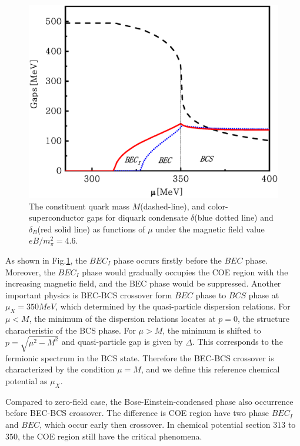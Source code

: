 \documentclass[prd, showpacs,nofootinbib,amsmath,amssymb,12pt]{revtex4}
\begin{document}
\begin{figure}[ht]
	\centering
	\includegraphics[scale=0.3]{1.eps}
	\caption{The constituent quark mass $M$(dashed-line), and color-superconductor gaps for diquark condensate $\delta$(blue dotted line) and $\delta_B$(red solid line) as functions of $\mu$ under the magnetic field value $eB/m^2_\pi=4.6$.}
	\label{f2}
\end{figure}

As shown in Fig.\ref{f2}, the $BEC_I$ phase occurs firstly before the $BEC$ phase.
Moreover, the $BEC_I$ phase would gradually occupies the COE region with the increasing magnetic field, 
and the BEC phase would be suppressed.
Another important physics is BEC-BCS crossover form $BEC$ phase to $BCS$ phase at $\mu_X = 350 MeV$,  
which determined by the quasi-particle dispersion relations.
For $\mu<M$, the minimum of the dispersion relations locates at $p=0$, the structure characteristic of the BCS phase.
For $\mu > M$, the minimum is shifted to $p = \sqrt{\mu^2-M^2}$ and quasi-particle gap is given by $\Delta$.
This corresponds to the fermionic spectrum in the BCS state.
Therefore the BEC-BCS crossover  is characterized by the condition $\mu =M$, and we define this reference chemical potential as $\mu_X$.

Compared to zero-field case, 
the Bose-Einstein-condensed phase also occurrence before BEC-BCS crossover.
The difference is COE region have two phase $BEC_I$ and $BEC$, which occur early then crossover.
In chemical potential section $313$ to $350$, the COE region still have the critical phenomena.
\end{document}
